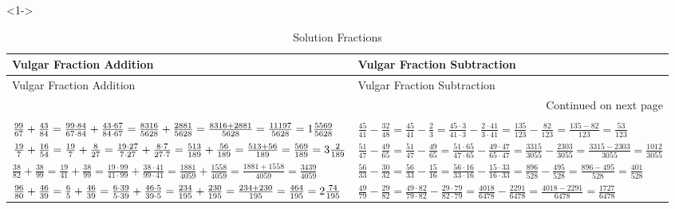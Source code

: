 \documentclass[ngerman,xcolor={table,dvipsnames},smaller,compress,hyperref={bookmarks,colorlinks}]{beamer}
\begin{document}
\begin{frame}[t,fragile]

\begin{block}<1->{}

\footnotesize
\begin{longtable}[l]{p{5.5cm}|p{5.5cm}}
\toprule
Vulgar Fraction Addition & Vulgar Fraction Subtraction \\
\midrule
\endfirsthead

\toprule
Vulgar Fraction Addition & Vulgar Fraction Subtraction \\
\midrule
\endhead
\midrule
\multicolumn{2}{r}{{Continued on next page}} \\
\bottomrule
\endfoot

\caption{Solution Fractions\label{solutionvulgar_fractions_addition}}\\
\endlastfoot
$ \frac{99}{67} + \frac{43}{84} = \frac{99 \cdot 84}{67 \cdot 84} + \frac{43 \cdot 67}{84 \cdot 67} = \frac{8316}{5628} + \frac{2881}{5628} = \frac{8316 + 2881}{5628} = \frac{11197}{5628} = \normalsize{1} \frac{5569}{5628} $                             & $ \frac{45}{41} - \frac{32}{48} = \frac{45}{41} - \frac{2}{3} = \frac{45 \cdot 3}{41 \cdot 3} - \frac{2 \cdot 41}{3 \cdot 41} = \frac{135}{123} - \frac{82}{123} = \frac{135 - 82}{123} = \frac{53}{123} $                                                \\
$ \frac{19}{7} + \frac{16}{54} = \frac{19}{7} + \frac{8}{27} = \frac{19 \cdot 27}{7 \cdot 27} + \frac{8 \cdot 7}{27 \cdot 7} = \frac{513}{189} + \frac{56}{189} = \frac{513 + 56}{189} = \frac{569}{189} = \normalsize{3} \frac{2}{189} $                    & $ \frac{51}{47} - \frac{49}{65} = \frac{51}{47} - \frac{49}{65} = \frac{51 \cdot 65}{47 \cdot 65} - \frac{49 \cdot 47}{65 \cdot 47} = \frac{3315}{3055} - \frac{2303}{3055} = \frac{3315 - 2303}{3055} = \frac{1012}{3055} $                              \\
$ \frac{38}{82} + \frac{38}{99} = \frac{19}{41} + \frac{38}{99} = \frac{19 \cdot 99}{41 \cdot 99} + \frac{38 \cdot 41}{99 \cdot 41} = \frac{1881}{4059} + \frac{1558}{4059} = \frac{1881 + 1558}{4059} = \frac{3439}{4059} $                                 & $ \frac{56}{33} - \frac{30}{32} = \frac{56}{33} - \frac{15}{16} = \frac{56 \cdot 16}{33 \cdot 16} - \frac{15 \cdot 33}{16 \cdot 33} = \frac{896}{528} - \frac{495}{528} = \frac{896 - 495}{528} = \frac{401}{528} $                                       \\
$ \frac{96}{80} + \frac{46}{39} = \frac{6}{5} + \frac{46}{39} = \frac{6 \cdot 39}{5 \cdot 39} + \frac{46 \cdot 5}{39 \cdot 5} = \frac{234}{195} + \frac{230}{195} = \frac{234 + 230}{195} = \frac{464}{195} = \normalsize{2} \frac{74}{195} $                & $ \frac{49}{79} - \frac{29}{82} = \frac{49 \cdot 82}{79 \cdot 82} - \frac{29 \cdot 79}{82 \cdot 79} = \frac{4018}{6478} - \frac{2291}{6478} = \frac{4018 - 2291}{6478} = \frac{1727}{6478} $                                                              \\

\end{longtable}
\end{block}
\end{frame}
\end{document}
